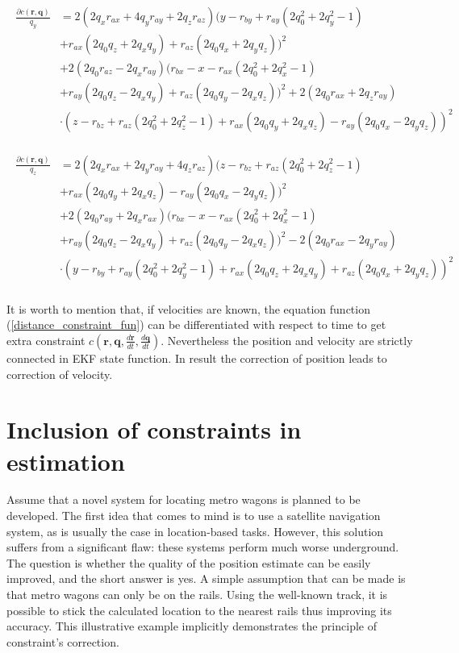 \begin{align}
	\begin{split}
	\frac{\partial c(\bm{r}, \bm{q})}{q_y} &= 2(2q_xr_{ax} + 4q_yr_{ay} + 2q_zr_{az})(y - r_{by} + r_{ay}(2q_0^2 + 2q_y^2 - 1)\\
	&+ r_{ax}(2q_0q_z + 2q_xq_y) + r_{az}(2q_0q_x + 2q_yq_z))^2\\
	&+ 2(2q_0r_{az} - 2q_xr_{ay})(r_{bx} - x - r_{ax}(2q_0^2 + 2q_x^2 - 1) \\
	&+ r_{ay}(2q_0q_z - 2q_xq_y) + r_{az}(2q_0q_y - 2q_xq_z))^2 + 2(2q_0r_{ax} + 2q_zr_{ay})\\
	&\cdot(z - r_{bz} + r_{az}(2q_0^2 + 2q_z^2 - 1) + r_{ax}(2q_0q_y + 2q_xq_z) - r_{ay}(2q_0q_x - 2q_yq_z))^2
\end{split}
\end{align}

\begin{align}
	\begin{split}
	\frac{\partial c(\bm{r}, \bm{q})}{q_z} &= 2(2q_xr_{ax} + 2q_yr_{ay} + 4q_zr_{az})(z - r_{bz} + r_{az}(2q_0^2 + 2q_z^2 - 1)\\
	&+ r_{ax}(2q_0q_y + 2q_xq_z) - r_{ay}(2q_0q_x - 2q_yq_z))^2\\
	&+ 2(2q_0r_{ay} + 2q_xr_{ax})(r_{bx} - x - r_{ax}(2q_0^2 + 2q_x^2 - 1)\\
	&+ r_{ay}(2q_0q_z - 2q_xq_y) + r_{az}(2q_0q_y - 2q_xq_z))^2 - 2(2q_0r_{ax} - 2q_yr_{ay})\\
	&\cdot(y - r_{by} + r_{ay}(2q_0^2 + 2q_y^2 - 1) + r_{ax}(2q_0q_z + 2q_xq_y) + r_{az}(2q_0q_x + 2q_yq_z))^2
	\label{distance_constraint_der2}
\end{split}
\end{align}
\\


It is worth to mention that, if velocities are known, the equation function (\ref{distance_constraint_fun}) can be differentiated with respect to time to get extra constraint $c(\bm{r}, \bm{q}, \frac{d\bm{r}}{dt}, \frac{d\bm{q}}{dt})$. Nevertheless the position and velocity are strictly connected in EKF state function. In result the correction of position leads to correction of velocity.



\section{Inclusion of constraints in estimation}

Assume that a novel system for locating metro wagons is planned to be developed. The first idea that comes to mind is to use a satellite navigation system, as is usually the case in location-based tasks. However, this solution suffers from a significant flaw: these systems perform much worse underground. The question is whether the quality of the position estimate can be easily improved, and the short answer is yes. A simple assumption that can be made is that metro wagons can only be on the rails. Using the well-known track, it is possible to stick the calculated location to the nearest rails thus improving its accuracy.
This illustrative example implicitly demonstrates the principle of constraint's correction.\\

